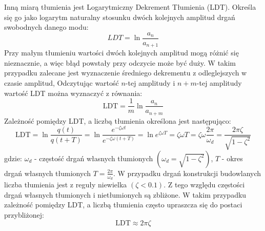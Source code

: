 Inną miarą tłumienia jest Logarytmiczny Dekrement Tłumienia (LDT). Określa się go jako logarytm naturalny stosunku dwóch kolejnych amplitud drgań swobodnych danego modu:
\begin{equation} \label{eq: LDT_1}
	LDT = \ln{\frac{a_n}{a_{n+1}}}
\end{equation}
Przy małym tłumieniu wartości dwóch kolejnych amplitud mogą różnić się nieznacznie, a więc błąd powstały przy odczycie może być duży. W takim przypadku zalecane jest wyznaczenie średniego dekrementu z odleglejszych w czasie amplitud, Odczytując wartość $n$-tej amplitudy i $n+m$-tej amplitudy wartość LDT można wyznaczyć z równania:
 \begin{equation} \label{eq: LDT_N}
 	\text{LDT} = \frac{1}{m}\ln{\frac{a_n}{a_{n+m}}}
 \end{equation}
Zależność pomiędzy LDT, a liczbą tłumienia określona jest następująco:
 \begin{equation} \label{eq: LDT_dampingratio}
	\text{LDT} = \ln{\frac{q(t)}{q(t+T)}}=\ln{\frac{e^{-\zeta\omega t}}{e^{-\zeta\omega(t+T)}}} =\ln{e^{\zeta\omega T}}=\zeta\omega T = \zeta\omega\frac{2\pi}{\omega_d}=\frac{2\pi\zeta}{\sqrt{1-\zeta^2}}
\end{equation}
gdzie: $\omega_d$ - częstość drgań własnych tłumionych $(\omega_d=\sqrt{1-\zeta^2})$, $T$ - okres drgań własnych tłumionych $T=\frac{2\pi}{\omega_d}$. W przypadku drgań konstrukcji budowlanych liczba tłumienia jest z reguły niewielka $(\zeta<0.1)$. Z tego względu częstości drgań własnych tłumionych i nietłumionych są zbliżone. W takim przypadku zależność pomiędzy LDT, a liczbą tłumienia często upraszcza się do postaci przybliżonej:
\begin{equation}
\text{LDT} \approx 2\pi\zeta
\end{equation}

